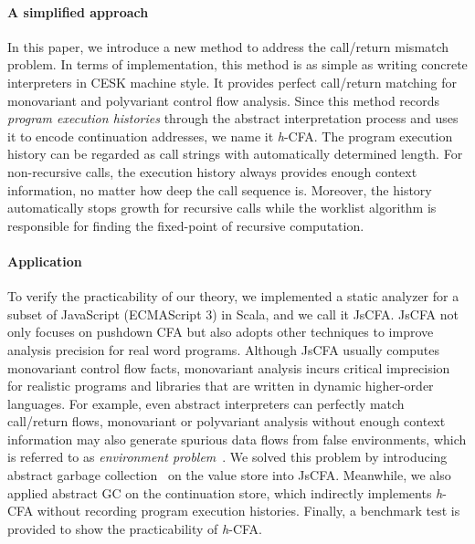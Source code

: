 \documentclass[12pt]{report}
\begin{document}
\paragraph{A simplified approach}
In this paper, we introduce a new method to address the call/return mismatch problem.
In terms of implementation, this method is as simple as writing concrete interpreters in CESK machine style.
It provides perfect call/return matching for monovariant and polyvariant control flow analysis.
Since this method records \emph{program execution histories} through the abstract interpretation process and uses it to encode continuation addresses, we name it \textit{h}-CFA\@.
The program execution history can be regarded as call strings with automatically determined length.
For non-recursive calls, the execution history always provides enough context information, no matter how deep the call sequence is.
Moreover, the history automatically stops growth for recursive calls while the worklist algorithm is responsible
for finding the fixed-point of recursive computation.

\paragraph{Application}
To verify the practicability of our theory, we implemented a static analyzer for a subset of JavaScript (ECMAScript 3) in Scala, and we call it JsCFA\@.
JsCFA not only focuses on pushdown CFA but also adopts other techniques to improve analysis precision for real word programs.
Although JsCFA usually computes monovariant control flow facts, monovariant analysis incurs critical imprecision for realistic programs and libraries that are written in dynamic higher-order languages.
For example, even abstract interpreters can perfectly match call/return flows, monovariant or polyvariant analysis without enough context information may also generate spurious data flows from false environments, which is referred to as \emph{environment problem}~\cite{shivers1991control}.
We solved this problem by introducing abstract garbage collection~\cite{might2006improving} on the value store into JsCFA\@.
Meanwhile, we also applied abstract GC on the continuation store, which indirectly implements \textit{h}-CFA without recording program execution histories.
Finally, a benchmark test is provided to show the practicability of \textit{h}-CFA\@.
\end{document}
